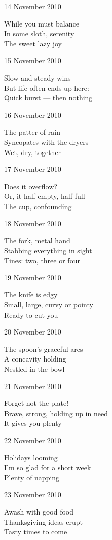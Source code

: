 \documentclass[12pt]{article}
\begin{document}
14 November 2010

While you must balance \\
In some sloth, serenity \\
The sweet lazy joy

15 November 2010

Slow and steady wins \\
But life often ends up here: \\
Quick burst --- then nothing

16 November 2010

The patter of rain \\
Syncopates with the dryers \\
Wet, dry, together


\newpage

17 November 2010

Does it overflow? \\
Or, it half empty, half full \\
The cup, confounding

18 November 2010

The fork, metal hand \\
Stabbing everything in sight \\
Tines: two, three or four

19 November 2010

The knife is edgy \\
Small, large, curvy or pointy \\
Ready to cut you

20 November 2010

The spoon's graceful arcs \\
A concavity holding \\
Nestled in the bowl

21 November 2010

Forget not the plate! \\
Brave, strong, holding up in need \\
It gives you plenty

22 November 2010

Holidays looming \\
I'm so glad for a short week \\
Plenty of napping

23 November 2010

Awash with good food \\
Thanksgiving ideas erupt \\
Tasty times to come


\newpage
\end{document}
